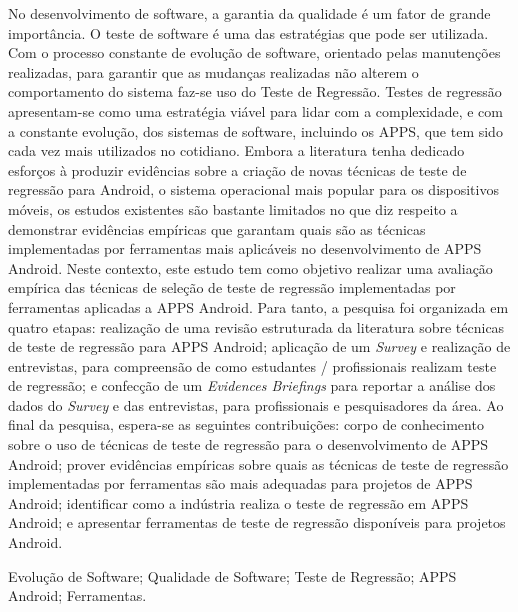 
\resumo


No desenvolvimento de software, a garantia da qualidade é um fator de grande importância. O teste de software é uma das estratégias que pode ser utilizada. Com o processo constante de evolução de software, orientado pelas manutenções realizadas, para garantir que as mudanças realizadas não alterem o comportamento do sistema faz-se uso do Teste de Regressão. Testes de regressão apresentam-se como uma estratégia viável para lidar com a complexidade, e com a constante evolução, dos sistemas de software, incluindo os \ac{APPS}, que tem sido cada vez mais utilizados no cotidiano. Embora a literatura tenha dedicado esforços à produzir evidências sobre a criação de novas técnicas de teste de regressão para Android,  o sistema operacional mais popular para os dispositivos móveis, os estudos existentes são bastante limitados no que diz respeito a demonstrar evidências empíricas que garantam quais são as técnicas implementadas por ferramentas mais aplicáveis no desenvolvimento de \ac{APPS} Android. Neste contexto, este estudo tem como objetivo realizar uma avaliação empírica das técnicas de seleção de teste de regressão implementadas por ferramentas aplicadas a \ac{APPS} Android. Para tanto, a pesquisa foi organizada em quatro etapas: realização de uma revisão estruturada da literatura sobre técnicas de teste de regressão para \ac{APPS} Android; aplicação de um \textit{Survey} e realização de entrevistas, para compreensão de como estudantes / profissionais realizam teste de regressão; e confecção de um \textit{Evidences Briefings} para reportar a análise dos dados do \textit{Survey} e das entrevistas, para profissionais e pesquisadores da área. Ao final da pesquisa, espera-se as seguintes contribuições: corpo de conhecimento sobre o uso de técnicas de teste de regressão para o desenvolvimento de \ac {APPS} Android; prover evidências empíricas sobre quais as técnicas de teste de regressão implementadas por ferramentas são mais adequadas para projetos de \ac{APPS} Android; identificar como a indústria realiza o teste de regressão em \ac{APPS} Android; e apresentar ferramentas de teste de regressão disponíveis para projetos Android.



\begin{keywords}
Evolução de Software; Qualidade de Software; Teste de Regressão; APPS Android; Ferramentas.
\end{keywords}

